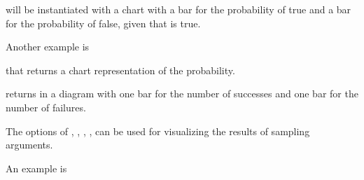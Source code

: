 \documentclass[letterpaper,10pt,english]{sphinxmanual}
\begin{document}
\sphinxAtStartPar
{} will be instantiated with a chart with a bar for the probability of  true and a bar for the probability of  false, given that  is true.

\sphinxAtStartPar
Another example is

\begin{sphinxVerbatim}[commandchars=\\\{\}]
 \PYG{p}{[}\PYG{p}{]}
\end{sphinxVerbatim}

\sphinxAtStartPar
that returns a chart representation of the probability.

\begin{sphinxVerbatim}[commandchars=\\\{\}]
 \PYG{p}{[}\PYG{p}{]}
\end{sphinxVerbatim}

\sphinxAtStartPar
returns in  a diagram with one bar for the number of successes and one bar for the number of failures.

\sphinxAtStartPar
The options of , , , , can be used for visualizing the results of sampling arguments.

\sphinxAtStartPar
An example is

\begin{sphinxVerbatim}[commandchars=\\\{\}]
 \PYG{p}{[}\PYG{p}{]}
\end{sphinxVerbatim}
\end{document}
